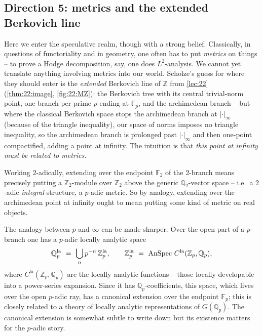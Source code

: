 \subsection{Direction 5: metrics and the extended Berkovich line}
\label{subsec:24:metrics}

Here we enter the speculative realm, though with a strong belief. Classically, in
questions of functoriality and in geometry, one often has to put \emph{metrics}
on things -- to prove a Hodge decomposition, say, one does $L^2$-analysis. We
cannot yet translate anything involving metrics into our world. Scholze's guess
for where they should enter is the \emph{extended} Berkovich line of $\mathbb Z$
from \cref{lec:22} (\cref{thm:22:image}, \cref{fig:22:MZ}): the Berkovich tree
with its central trivial-norm point, one branch per prime $p$ ending at
$\mathbb F_p$, and the archimedean branch -- but where the classical Berkovich
space stops the archimedean branch at $|\cdot|_\infty$ (because of the triangle
inequality), our space of norms imposes no triangle inequality, so the
archimedean branch is prolonged past $|\cdot|_\infty$ and then one-point
compactified, adding a point at infinity. The intuition is that
\emph{this point at infinity must be related to metrics.}

\begin{remark}
\label{rmk:24:metric-evidence}
Working $2$-adically, extending over the endpoint $\mathbb F_2$ of the
$2$-branch means precisely putting a $\mathbb Z_2$-module over $\mathbb Z_2$
above the generic $\mathbb Q_2$-vector space -- i.e.\ a $2$-adic
\emph{integral} structure, a $p$-adic metric. So by analogy, extending over the
archimedean point at infinity ought to mean putting some kind of metric on real
objects.
\end{remark}

The analogy between $p$ and $\infty$ can be made sharper. Over the open part of a
$p$-branch one has a $p$-adic locally analytic space
\begin{equation*}
\mathbb Q_p^{\mathrm{la}}\ =\ \bigcup_{n} p^{-n}\,\mathbb Z_p^{\mathrm{la}},
\qquad
\mathbb Z_p^{\mathrm{la}}\ =\ \operatorname{AnSpec}\, C^{\mathrm{la}}(\mathbb Z_p,\mathbb Q_p),
\end{equation*}
where $C^{\mathrm{la}}(\mathbb Z_p,\mathbb Q_p)$ are the locally analytic
functions -- those locally developable into a power-series expansion. Since it
has $\mathbb Q_p$-coefficients, this space, which lives over the open $p$-adic
ray, has a canonical extension over the endpoint $\mathbb F_p$; this is closely
related to a theory of locally analytic representations of $G(\mathbb Q_p)$. The
canonical extension is somewhat subtle to write down but its existence matters
for the $p$-adic story.

